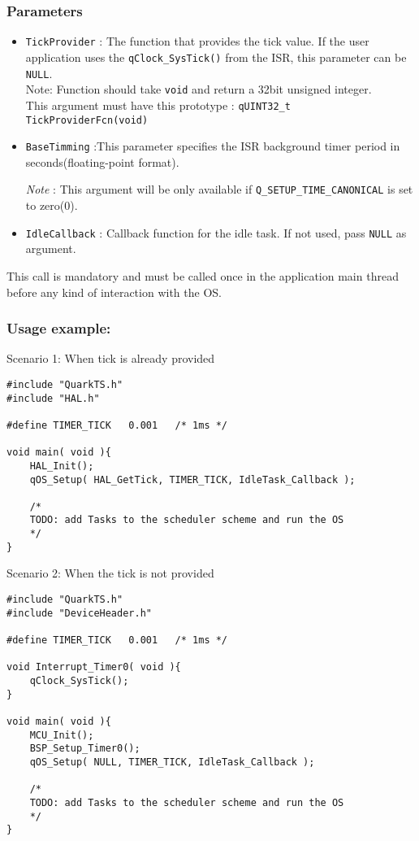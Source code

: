 \subsubsection*{Parameters}
\begin{itemize}
    \item \lstinline{TickProvider} : The function that provides the tick value. If the user application uses the \lstinline{qClock_SysTick()} from the ISR, this parameter can be \lstinline{NULL}. \\
    Note: Function should take \lstinline{void} and return a 32bit unsigned integer.  \\
    This argument must have this prototype : \lstinline{qUINT32_t TickProviderFcn(void)}
    \item \lstinline{BaseTimming} :This parameter specifies the ISR background timer period in seconds(floating-point format).
    
    \textit{Note} : This argument will be only available if \lstinline{Q_SETUP_TIME_CANONICAL} is set to zero(0).
    \item \lstinline{IdleCallback} : Callback function for the idle task. If not used, pass \lstinline{NULL} as argument.
\end{itemize}


\begin{tcolorbox}
\HandRight This call is mandatory and must be called once in the application main thread before any kind of interaction with the OS.
\end{tcolorbox}

\subsubsection*{Usage example:}
Scenario 1: When tick is already provided
\begin{lstlisting}[style=CStyle]
#include "QuarkTS.h"
#include "HAL.h"

#define TIMER_TICK   0.001   /* 1ms */ 

void main( void ){
    HAL_Init(); 
    qOS_Setup( HAL_GetTick, TIMER_TICK, IdleTask_Callback );
    
    /*
    TODO: add Tasks to the scheduler scheme and run the OS
    */
}
\end{lstlisting}


Scenario 2: When the tick is not provided
\begin{lstlisting}[style=CStyle]
#include "QuarkTS.h"
#include "DeviceHeader.h"

#define TIMER_TICK   0.001   /* 1ms */ 

void Interrupt_Timer0( void ){
    qClock_SysTick();
}

void main( void ){
    MCU_Init();
    BSP_Setup_Timer0(); 
    qOS_Setup( NULL, TIMER_TICK, IdleTask_Callback ); 
    
    /*
    TODO: add Tasks to the scheduler scheme and run the OS
    */
}
\end{lstlisting}

